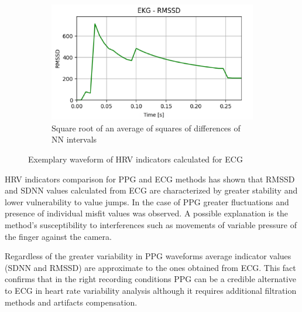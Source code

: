 \documentclass[journal]{IEEEtran}
\begin{document}
\begin{figure}[h]
    \vspace{0.2cm}  
    \begin{subfigure}{0.47\textwidth}
        \centering
        \includegraphics[width=\linewidth]{RMSSD_EKG.png}
        \caption{Square root of an average of squares of differences of NN intervals}
    \end{subfigure}  
    \caption{Exemplary waveform of HRV indicators calculated for ECG}
\end{figure}

HRV indicators comparison for PPG and ECG methods has shown that RMSSD and SDNN values calculated from ECG are characterized by greater stability and lower vulnerability to value jumps. In the case of PPG greater fluctuations and presence of individual misfit values was observed. A possible explanation is the method's susceptibility to interferences such as movements of variable pressure of the finger against the camera.

Regardless of the greater variability in PPG waveforms average indicator values (SDNN and RMSSD) are approximate to the ones obtained from ECG. This fact confirms that in the right recording conditions PPG can be a credible alternative to ECG in heart rate variability analysis although it requires additional filtration methods and artifacts compensation.
\end{document}
